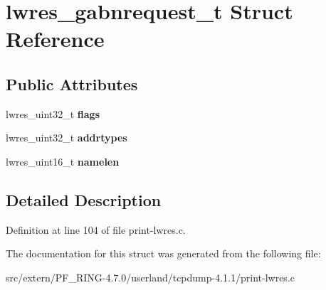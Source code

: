 \hypertarget{structlwres__gabnrequest__t}{
\section{lwres\_\-gabnrequest\_\-t Struct Reference}
\label{structlwres__gabnrequest__t}
}
\subsection*{Public Attributes}
\begin{DoxyCompactItemize}
\item 
\hypertarget{structlwres__gabnrequest__t_af562247384b8ff9e10204767e16b50b8}{
lwres\_\-uint32\_\-t {\bfseries flags}}
\label{structlwres__gabnrequest__t_af562247384b8ff9e10204767e16b50b8}

\item 
\hypertarget{structlwres__gabnrequest__t_a179d8366c88551b6254029ae814dc3de}{
lwres\_\-uint32\_\-t {\bfseries addrtypes}}
\label{structlwres__gabnrequest__t_a179d8366c88551b6254029ae814dc3de}

\item 
\hypertarget{structlwres__gabnrequest__t_acfcf461ec9a3f7e25da70a0f6870c35d}{
lwres\_\-uint16\_\-t {\bfseries namelen}}
\label{structlwres__gabnrequest__t_acfcf461ec9a3f7e25da70a0f6870c35d}

\end{DoxyCompactItemize}


\subsection{Detailed Description}


Definition at line 104 of file print-\/lwres.c.



The documentation for this struct was generated from the following file:\begin{DoxyCompactItemize}
\item 
src/extern/PF\_\-RING-\/4.7.0/userland/tcpdump-\/4.1.1/print-\/lwres.c\end{DoxyCompactItemize}
